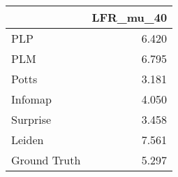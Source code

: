 \begin{tabular}{lr}
\toprule
{} & LFR_mu_40 \\
\midrule
PLP          &     6.420 \\
PLM          &     6.795 \\
Potts        &     3.181 \\
Infomap      &     4.050 \\
Surprise     &     3.458 \\
Leiden       &     7.561 \\
Ground Truth &     5.297 \\
\bottomrule
\end{tabular}
